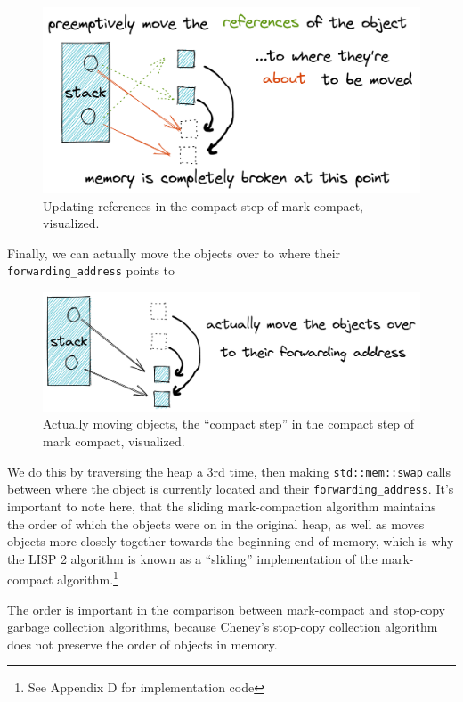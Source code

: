 \documentclass[index]{subfiles}
\begin{document}
\begin{figure}[H]
    \centering
    \includegraphics[scale=0.3]{pics/update-references.png}
    \caption{Updating references in the compact step of mark compact, visualized.}
\end{figure}

Finally, we can actually move the objects over to where their \verb+forwarding_address+ points to

\begin{figure}[H]
    \centering
    \includegraphics[scale=0.25]{pics/actually-move.png}
    \caption{Actually moving objects, the ``compact step'' in the compact step of mark compact, visualized.}
\end{figure}

We do this by traversing the heap a 3rd time, then making \texttt{std::mem::swap} calls between where the object is currently located and their \verb+forwarding_address+. It's important to note here, that the sliding mark-compaction algorithm maintains the order of which the objects were on in the original heap, as well as moves objects more closely together towards the beginning end of memory, which is why the LISP 2 algorithm is known as a ``sliding'' implementation of the mark-compact algorithm.\footnote{See Appendix D for implementation code}

The order is important in the comparison between mark-compact and stop-copy garbage collection algorithms, because Cheney's stop-copy collection algorithm does not preserve the order of objects in memory.
\end{document}
